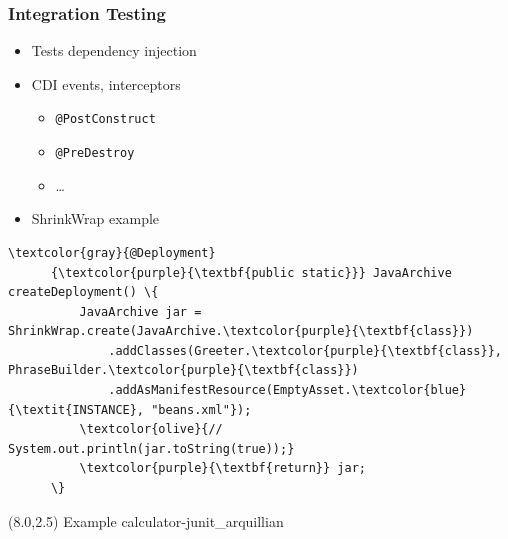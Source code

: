 \documentclass[10pt,xcolor=pdflatex]{beamer}
\begin{document}
\begin{frame}[fragile]\frametitle{Integration Testing}
\begin{itemize}
	\item Tests dependency injection
	\item CDI events, interceptors
	  \begin{itemize}
    	\item \texttt{@PostConstruct}
		\item \texttt{@PreDestroy}
		\item \ldots
	  \end{itemize}
    \item ShrinkWrap example
\end{itemize}
    \begin{Verbatim}[fontsize=\scriptsize, commandchars=\\\{\}]
      \textcolor{gray}{@Deployment}
      {\textcolor{purple}{\textbf{public static}}} JavaArchive createDeployment() \{
          JavaArchive jar = ShrinkWrap.create(JavaArchive.\textcolor{purple}{\textbf{class}})
              .addClasses(Greeter.\textcolor{purple}{\textbf{class}}, PhraseBuilder.\textcolor{purple}{\textbf{class}})
              .addAsManifestResource(EmptyAsset.\textcolor{blue}{\textit{INSTANCE}, "beans.xml"});
          \textcolor{olive}{// System.out.println(jar.toString(true));}
          \textcolor{purple}{\textbf{return}} jar;
      \}
\end{Verbatim}
\begin{textblock}{8}(8.0,2.5)
    {\footnotesize Example calculator-junit\_arquillian}
\end{textblock}
\end{frame}
\end{document}
